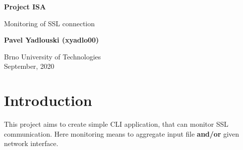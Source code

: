 \documentclass[12pt,a4paper]{article}
\begin{document}
    \begin{titlepage}
        \begin{center}
            \vspace*{1cm}
    
            \Large{\textbf{Project ISA}}
    
            \vspace{0.5cm}
            Monitoring of SSL connection
                
            \vspace{1.5cm}
            
            \textbf{Pavel Yadlouski (xyadlo00)}
    
            \vfill
                
            \vspace{0.8cm}
        
            Brno University of Technologies\\
            September, 2020
                
        \end{center}
    \end{titlepage}
    
    \tableofcontents
    \newpage

    \section{Introduction}
    This project aims to create simple CLI application, that can monitor SSL communication.
    Here monitoring means to aggregate input file \textbf{and/or} given network interface.  
        
\end{document}
